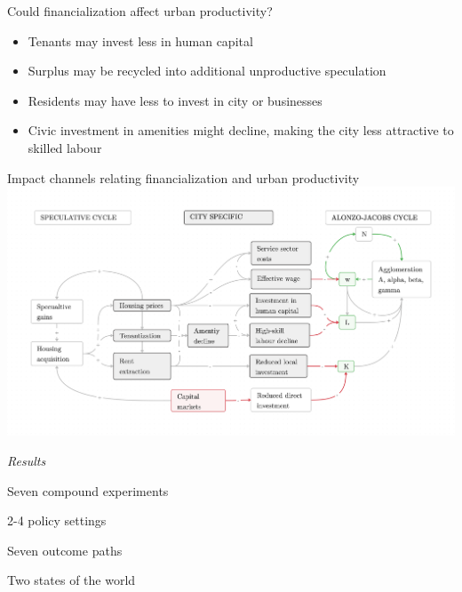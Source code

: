 \documentclass[]{beamer} %
\begin{document}
\begin{frame}{Could financialization affect urban productivity?}
\vspace{.75cm}
\begin{itemize}\Large
\item Tenants may invest less in human capital
\item Surplus may be recycled into additional unproductive speculation
\item Residents may have less to invest in city or businesses
\item Civic investment in amenities might decline, making the city less attractive to skilled labour
\end{itemize}
\end{frame}


\begin{frame}{Impact channels relating financialization and urban productivity}
\includegraphics[scale=.09]{fig/impact-channels.png}
\end{frame}


\begin{frame}{}
  \centering \Huge
  \emph{Results}
\vspace{1cm}

 \Large Seven compound experiments 
 
 2-4 policy settings  
 \vspace{.5cm}

Seven outcome paths 

Two states of the world 
\end{frame}
\end{document}
